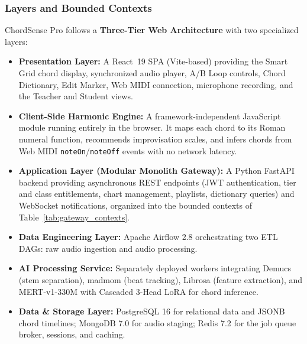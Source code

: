 \documentclass[a4paper]{article}
\begin{document}
\subsubsection{Layers and Bounded Contexts}

ChordSense Pro follows a \textbf{Three-Tier Web Architecture} with two specialized layers:

\begin{itemize}
    \item \textbf{Presentation Layer:} A React~19 SPA (Vite-based) providing the Smart Grid chord display, synchronized audio player, A/B Loop controls, Chord Dictionary, Edit Marker, Web MIDI connection, microphone recording, and the Teacher and Student views.
    \item \textbf{Client-Side Harmonic Engine:} A framework-independent JavaScript module running entirely in the browser. It maps each chord to its Roman numeral function, recommends improvisation scales, and infers chords from Web MIDI \texttt{noteOn}/\texttt{noteOff} events with no network latency.
    \item \textbf{Application Layer (Modular Monolith Gateway):} A Python FastAPI backend providing asynchronous REST endpoints (JWT authentication, tier and class entitlements, chart management, playlists, dictionary queries) and WebSocket notifications, organized into the bounded contexts of Table~\ref{tab:gateway_contexts}.
    \item \textbf{Data Engineering Layer:} Apache Airflow 2.8 orchestrating two ETL DAGs: raw audio ingestion and audio processing.
    \item \textbf{AI Processing Service:} Separately deployed workers integrating Demucs (stem separation), madmom (beat tracking), Librosa (feature extraction), and MERT-v1-330M with Cascaded 3-Head LoRA for chord inference.
    \item \textbf{Data \& Storage Layer:} PostgreSQL 16 for relational data and JSONB chord timelines; MongoDB 7.0 for audio staging; Redis 7.2 for the job queue broker, sessions, and caching.
\end{itemize}
\end{document}
